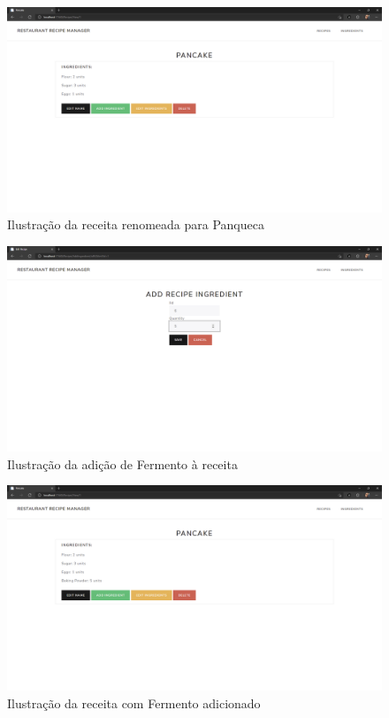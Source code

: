\FloatBarrier
\begin{figure}[!hbt]
    \centering
    \includegraphics[width=14cm]{Resources/WebApp/Recipes/recipe (4).png}
    \caption{Ilustração da receita renomeada para Panqueca}
    
\end{figure}
\FloatBarrier
\begin{figure}[!hbt]
    \centering
    \includegraphics[width=14cm]{Resources/WebApp/Recipes/recipe (5).png}
    \caption{Ilustração da adição de Fermento à receita}
    
\end{figure}
\FloatBarrier
\begin{figure}[!hbt]
    \centering
    \includegraphics[width=14cm]{Resources/WebApp/Recipes/recipe (6).png}
    \caption{Ilustração da receita com Fermento adicionado}
    
\end{figure}
